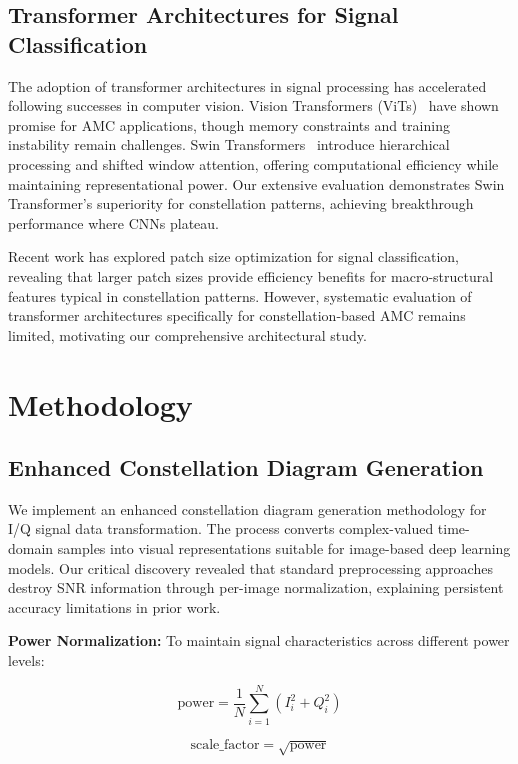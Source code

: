 \documentclass{ELSP}
\begin{document}
\subsection{Transformer Architectures for Signal Classification}

The adoption of transformer architectures in signal processing has accelerated following successes in computer vision. Vision Transformers (ViTs)~\cite{11} have shown promise for AMC applications, though memory constraints and training instability remain challenges. Swin Transformers~\cite{12} introduce hierarchical processing and shifted window attention, offering computational efficiency while maintaining representational power. Our extensive evaluation demonstrates Swin Transformer's superiority for constellation patterns, achieving breakthrough performance where CNNs plateau.

Recent work has explored patch size optimization for signal classification, revealing that larger patch sizes provide efficiency benefits for macro-structural features typical in constellation patterns. However, systematic evaluation of transformer architectures specifically for constellation-based AMC remains limited, motivating our comprehensive architectural study.

\section{Methodology}

\subsection{Enhanced Constellation Diagram Generation}

We implement an enhanced constellation diagram generation methodology for I/Q signal data transformation. The process converts complex-valued time-domain samples into visual representations suitable for image-based deep learning models. Our critical discovery revealed that standard preprocessing approaches destroy SNR information through per-image normalization, explaining persistent accuracy limitations in prior work.

\textbf{Power Normalization:} To maintain signal characteristics across different power levels:

\begin{equation}
\text{power} = \frac{1}{N} \sum_{i=1}^{N} (I_i^2 + Q_i^2)
\end{equation}

\begin{equation}
\text{scale\_factor} = \sqrt{\text{power}}
\end{equation}
\end{document}
